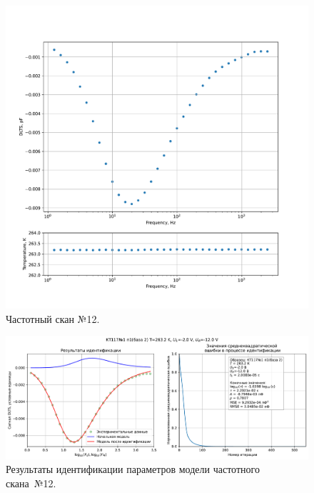 \begin{figure}[!ht]
    \centering
    \includegraphics[width=1\textwidth]{../plots/КТ117№1_п1(база 2)_2500Гц-1Гц_1пФ_-10С_-2В-12В_200мВ_20мкс_шаг_0,1.pdf}
    \caption{Частотный скан №12.}
    \label{pic:frequency_scan_12}
\end{figure}

\begin{figure}[!ht]
    \centering
    \includegraphics[width=1\textwidth]{../plots/КТ117№1_п1(база 2)_2500Гц-1Гц_1пФ_-10С_-2В-12В_200мВ_20мкс_шаг_0,1_model.pdf}
    \caption{Результаты идентификации параметров модели частотного скана~№12.}
    \label{pic:frequency_scan_model12}
\end{figure}

\pagebreak


